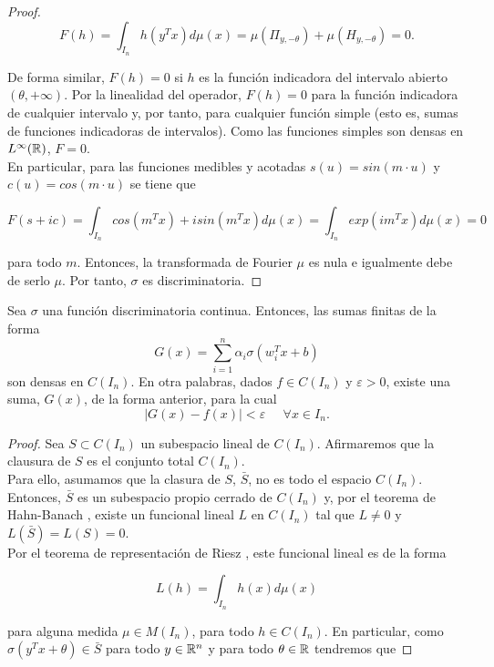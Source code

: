 \begin{itemize}
\begin{proof}
$$F(h)=\int_{I_n}h(y^Tx)d\mu(x)=\mu(\Pi_{y,-\theta})+\mu(H_{y,-\theta})=0.$$

De forma similar, $F(h)=0$ si $h$ es la función indicadora del intervalo abierto $(\theta,+\infty)$. Por la linealidad del operador, $F(h)=0$ para la función indicadora de cualquier intervalo y, por tanto, para cualquier función simple (esto es, sumas de funciones indicadoras de intervalos). Como las funciones simples son densas en $L^\infty(\mathbb{R})$, $F=0$.\\

En particular, para las funciones medibles y acotadas $s(u)=sin(m\cdot u)$ y $c(u)=cos(m\cdot u)$ se tiene que

$$F(s+ic)=\int_{I_n} cos(m^Tx)+isin(m^Tx)d\mu(x)=\int_{I_n}exp(im^Tx)d\mu(x)=0$$

para todo $m$. Entonces, la transformada de Fourier $\mu$ es nula e igualmente debe de serlo $\mu$. Por tanto, $\sigma$ es discriminatoria.
\end{proof}

\begin{teorema}\label{thm:discriminatoria}
Sea $\sigma$ una función discriminatoria continua. Entonces, las sumas finitas de la forma $$G(x)=\sum_{i=1}^n \alpha_i \sigma(w_i^Tx+b)$$ son densas en $C(I_n)$. En otra palabras, dados $f\in C(I_n)$ y $\varepsilon>0$, existe una suma, $G(x)$, de la forma anterior, para la cual $$|G(x)-f(x)|<\varepsilon \;\;\;\;\; \forall x \in I_n.$$
\end{teorema}
\begin{proof}
Sea $S\subset C(I_n)$ un subespacio lineal de $C(I_n)$. Afirmaremos que la clausura de $S$ es el conjunto total $C(I_n)$.\\

Para ello, asumamos que la clasura de $S$, $\bar S$, no es todo el espacio $C(I_n)$. Entonces, $\bar S$ es un subespacio propio cerrado de $C(I_n)$ y, por el teorema de Hahn-Banach \cite{rudin1991functional}, existe un funcional lineal $L$ en $C(I_n)$ tal que $L \ne 0$ y $L(\bar S)=L(S)=0$.\\

Por el teorema de representación de Riesz \cite{rudin1987real}, este funcional lineal es de la forma

$$L(h)=\int_{I_n}h(x)d\mu(x)$$

para alguna medida $\mu\in M(I_n)$, para todo $h\in C(I_n)$. En particular, como $\sigma (y^T x +\theta)\in \bar S$ para todo $y\in\mathbb{R}^n$ y para todo $\theta \in \mathbb{R}$ tendremos que


\end{proof}
\end{itemize}
